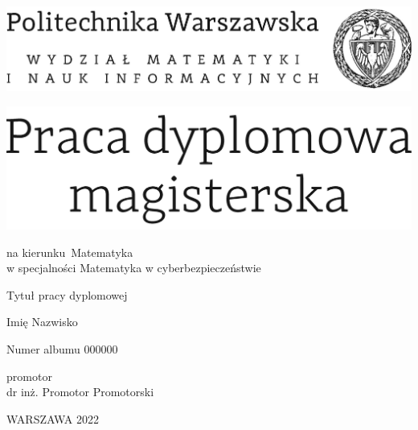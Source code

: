 \documentclass[12pt,twoside,a4paper]{article}
\newcommand{\discipline}{Matematyka}
\newcommand{\spec}{Matematyka w cyberbezpieczeństwie} %
\renewcommand{\title}{Tytuł pracy dyplomowej}
\renewcommand{\author}{Imię Nazwisko}
\newcommand{\album}{000000}
\newcommand{\supervisor}{dr inż. Promotor Promotorski}
\renewcommand{\year}{2022}
\begin{document}
\pagestyle{empty}

\begin{center}
\includegraphics[scale=1.]{img/politechnika} 
\vspace{70pt}


\includegraphics[scale=1.]{img/praca_mgr} %

{ \arial na kierunku~\discipline
\\ w specjalności \spec %

\vspace{40pt}
{\arial \large \title}

\vspace{50pt}

{\arial \huge \author}

\vspace{5pt}

Numer albumu \album

\vspace{40pt}

promotor \\
{\arial \supervisor}


 \vfill
WARSZAWA \year \\
}
\end{center}
\end{document}
